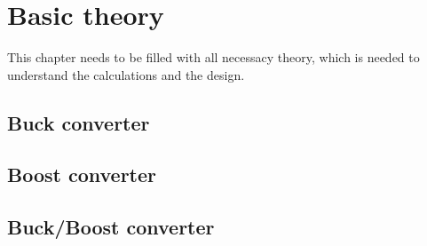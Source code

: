 \chapter{Basic theory}
\label{sec:bath}

This chapter needs to be filled with all necessacy theory, which is needed to understand the calculations and the design.

\section{Buck converter}
\label{sec:buco}

\section{Boost converter}
\label{sec:boco}

\section{Buck/Boost converter}
\label{sec:buboco}



